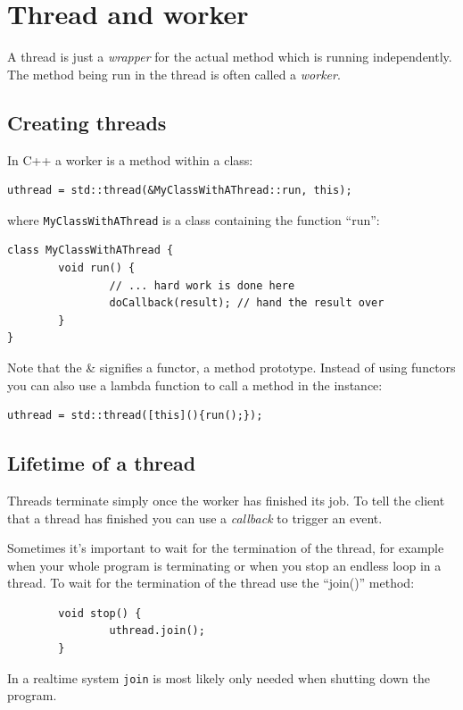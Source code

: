 \documentclass[12pt]{report}
\begin{document}
\section{Thread and worker}
A thread is just a \textsl{wrapper} for the actual method
which is running independently. The method being run in the thread
is often called a \textsl{worker}.

\subsection{Creating threads}
In C++ a worker is a method within
a class:
\begin{verbatim}
uthread = std::thread(&MyClassWithAThread::run, this);
\end{verbatim}
where \texttt{MyClassWithAThread} is a class containing the function ``run'':
\begin{verbatim}
class MyClassWithAThread {
        void run() {
                // ... hard work is done here
                doCallback(result); // hand the result over
        }
}
\end{verbatim}
Note that the \& signifies a functor, a method prototype.
Instead of using functors you can also use a lambda function
to call a method in the instance:
\begin{verbatim}
uthread = std::thread([this](){run();});
\end{verbatim}


\subsection{Lifetime of a thread}
Threads terminate simply once the worker has finished its job.
To tell the client that a thread has finished you can use a
\textsl{callback} to trigger an event.

Sometimes it's important to wait for the termination of the thread,
for example when your whole program is terminating or when
you stop an endless loop in a thread. To wait for the termination
of the thread use the ``join()'' method:
\begin{verbatim}
        void stop() {
                uthread.join();
        }
\end{verbatim}
In a realtime system \texttt{join} is most likely only needed when shutting down the program.
\end{document}
